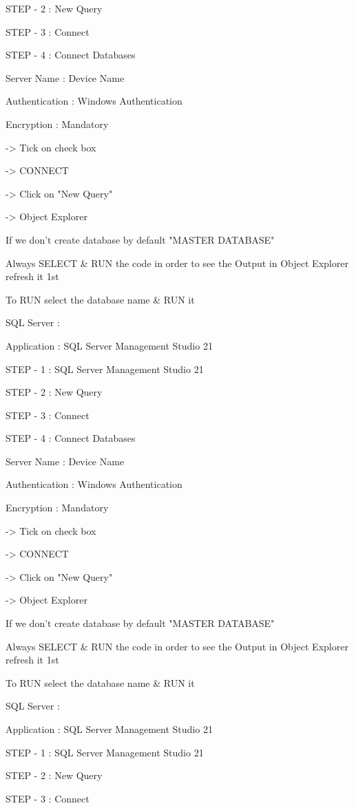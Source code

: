 STEP - 2 : New Query

STEP - 3 : Connect

STEP - 4 : Connect Databases


Server Name : Device Name

Authentication : Windows Authentication

Encryption : Mandatory

-> Tick on check box

-> CONNECT

-> Click on "New Query"

-> Object Explorer


If we don't create database by default "MASTER DATABASE"


Always SELECT & RUN the code in order to see the Output in Object Explorer refresh it 1st


To RUN select the database name & RUN it

SQL Server :

Application : SQL Server Management Studio 21

STEP - 1 : SQL Server Management Studio 21

STEP - 2 : New Query

STEP - 3 : Connect

STEP - 4 : Connect Databases


Server Name : Device Name

Authentication : Windows Authentication

Encryption : Mandatory

-> Tick on check box

-> CONNECT

-> Click on "New Query"

-> Object Explorer


If we don't create database by default "MASTER DATABASE"


Always SELECT & RUN the code in order to see the Output in Object Explorer refresh it 1st


To RUN select the database name & RUN it

SQL Server :

Application : SQL Server Management Studio 21

STEP - 1 : SQL Server Management Studio 21

STEP - 2 : New Query

STEP - 3 : Connect

